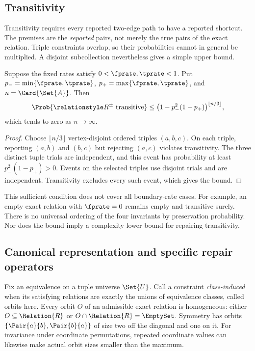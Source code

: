 \documentclass[ ../main.tex]{subfiles}
\begin{document}
\subsection{Transitivity}
\label{sec:transitive}
Transitivity requires every reported two-edge path to have a reported shortcut.
The premises are the \emph{reported} pairs, not merely the true pairs of the
exact relation. Triple constraints overlap, so their probabilities cannot in
general be multiplied. A disjoint subcollection nevertheless gives a simple
upper bound.

\begin{theorem}
\label{thm:transitive_preservation}
Suppose the fixed rates satisfy $0<\fprate,\tprate<1$. Put
$p_-=\min\{\fprate,\tprate\}$, $p_+=\max\{\fprate,\tprate\}$, and
$n=\Card{\Set{A}}$. Then
\begin{equation}
 \Prob{\ARelation{R}\text{ transitive}}
 \le \bigl(1-p_-^2(1-p_+)\bigr)^{\lfloor n/3\rfloor},
\end{equation}
which tends to zero as $n\to\infty$.
\end{theorem}
\begin{proof}
Choose $\lfloor n/3\rfloor$ vertex-disjoint ordered triples $(a,b,c)$.
On each triple, reporting $(a,b)$ and $(b,c)$ but rejecting $(a,c)$ violates
transitivity. The three distinct tuple trials are independent, and this event
has probability at least $p_-^2(1-p_+)>0$. Events on the selected triples use
disjoint trials and are independent. Transitivity excludes every such event,
which gives the bound.
\end{proof}

This sufficient condition does not cover all boundary-rate cases. For example,
an empty exact relation with $\fprate=0$ remains empty and transitive surely.
There is no universal ordering of the four invariants by preservation
probability. Nor does the bound imply a complexity lower bound for repairing
transitivity.

\subsection{Canonical representation and specific repair operators}
\label{sec:closure_dichotomy}
Fix an equivalence on a tuple universe $\Set{U}$. Call a constraint
\emph{class-induced} when its satisfying relations are exactly the unions of
equivalence classes, called orbits here. Every orbit $O$ of an admissible exact
relation is homogeneous: either $O\subseteq\Relation{R}$ or
$O\cap\Relation{R}=\EmptySet$. Symmetry has orbits
$\{\Pair{a}{b},\Pair{b}{a}\}$ of size two off the diagonal and one on it.
For invariance under coordinate permutations, repeated coordinate values can
likewise make actual orbit sizes smaller than the maximum.
\end{document}
